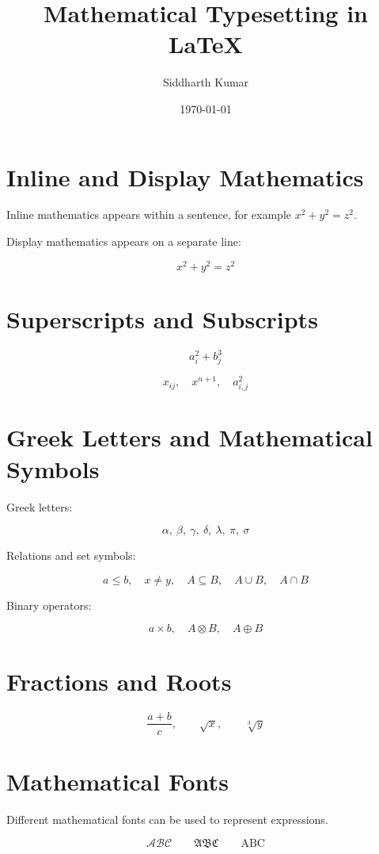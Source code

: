 \documentclass{article}
\title{Mathematical Typesetting in LaTeX}
\author{Siddharth Kumar}
\date{\today}
\begin{document}
\maketitle

\section{Inline and Display Mathematics}

Inline mathematics appears within a sentence, for example
\(x^2 + y^2 = z^2\).

Display mathematics appears on a separate line:

\[
x^2 + y^2 = z^2
\]

\section{Superscripts and Subscripts}

\[
a_i^2 + b_j^3
\]

\[
x_{ij}, \quad x^{n+1}, \quad a_{i,j}^{2}
\]

\section{Greek Letters and Mathematical Symbols}

Greek letters:

\[
\alpha,\ \beta,\ \gamma,\ \delta,\ \lambda,\ \pi,\ \sigma
\]

Relations and set symbols:

\[
a \leq b,\quad x \neq y,\quad
A \subseteq B,\quad A \cup B,\quad A \cap B
\]

Binary operators:

\[
a \times b,\quad A \otimes B,\quad A \oplus B
\]

\section{Fractions and Roots}

\[
\frac{a+b}{c}, \qquad
\sqrt{x}, \qquad
\sqrt[3]{y}
\]

\section{Mathematical Fonts}

Different mathematical fonts can be used to represent expressions.

\[
\mathcal{ABC} \qquad
\mathfrak{ABC} \qquad
\mathrm{ABC}
\]
\end{document}
